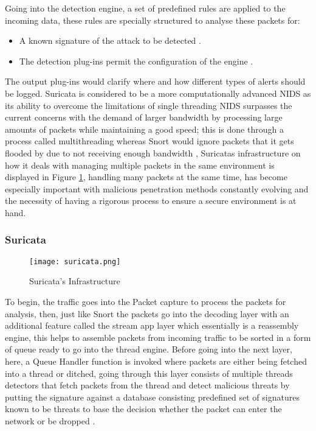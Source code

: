 \documentclass[12pt]{article}
\begin{document}
		
		Going into the  detection engine, a set of predefined rules are applied to the incoming data, these rules are specially structured to analyse these packets for:
		
		\begin{itemize}
			
			\item A known signature of the attack to be detected \cite{gmez_2009_design}.
			\item The detection plug-ins permit the configuration of the engine \cite{gmez_2009_design}.
		\end{itemize}
		
		The output plug-ins would clarify where and how different types of alerts should be logged.
		Suricata is considered to be a more computationally advanced NIDS as its ability to overcome the limitations of single threading NIDS  surpasses the current concerns with the demand of larger bandwidth by processing large amounts of packets while maintaining a good speed; this is done through a process called multithreading whereas Snort would ignore packets that it gets flooded by due to not receiving enough bandwidth \cite{park_2016_performance}, Suricatas infrastructure on how it deals with managing multiple packets in the same environment is displayed in Figure \ref{fig:suricata}, handling many packets at the same time, has become especially important with malicious penetration methods constantly evolving and the necessity of having a rigorous process to ensure a secure environment is at hand.
		
		\subsubsection{Suricata}
		\begin{center}
			\begin{figure}[H]
				\centering
				\texttt{[image: suricata.png]}
				\caption{Suricata's Infrastructure \cite{fekolkin_2015_intrusion}}
				\label{fig:suricata}
			\end{figure}
		\end{center}
		
		
		To begin, the traffic goes into the Packet capture to process the packets for analysis, then, just like Snort the packets go into the decoding layer with an additional feature called the stream app layer which essentially is a reassembly engine, this helps to assemble packets from incoming traffic to be sorted in a form of queue ready to go into the thread engine. Before going into the next layer, here, a Queue Handler function is invoked where packets are either being fetched into a thread or ditched, going through this layer consists of multiple threads detectors that fetch packets from the thread and detect malicious threats by putting the signature against a database consisting predefined set of signatures known to be threats to base the decision whether the packet can enter the network or be dropped \cite{fekolkin_2015_intrusion}.
		
\end{document}

